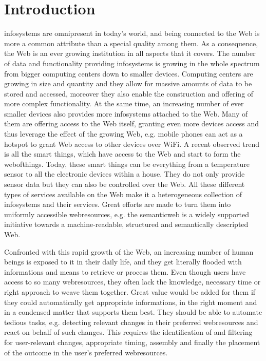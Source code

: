 
\chapter{Introduction}

\textrm{\glspl{infosystem}} are omnipresent in today's world, and being connected to the Web is more a common attribute than a special quality among them.
As a consequence, the Web is an ever growing institution in all aspects that it covers.
The number of data and functionality providing \textrm{\glspl{infosystem}} is growing in the whole spectrum from bigger computing centers down to smaller devices.
Computing centers are growing in size and quantity and they allow for massive amounts of data to be stored and accessed, moreover they also enable the construction and offering of more complex functionality.
At the same time, an increasing number of ever smaller devices also provides more \textrm{\glspl{infosystem}} attached to the Web.
Many of them are offering access to the Web itself, granting even more devices access and thus leverage the effect of the growing Web, e.g. mobile phones can act as a hotspot to grant Web access to other devices over \textrm{WiFi}.
A recent observed trend is all the smart things, which have access to the Web and start to form the \textrm{\gls{webofthings}}.
Today, these smart things can be everything from a temperature sensor to all the electronic devices within a house.
They do not only provide sensor data but they can also be controlled over the Web.
All these different types of services available on the Web make it a heterogeneous collection of \textrm{\glspl{infosystem}} and their services.
Great efforts are made to turn them into uniformly accessible \textrm{\glspl{webresource}}, e.g. the \textrm{\gls{semanticweb}} is a widely supported initiative towards a machine-readable, structured and semantically descripted Web.

Confronted with this rapid growth of the Web, an increasing number of human beings is exposed to it in their daily life, and they get literally flooded with informations and means to retrieve or process them.
Even though users have access to so many \textrm{\glspl{webresource}}, they often lack the knowledge, necessary time or right approach to weave them together.
Great value would be added for them if they could automatically get appropriate informations, in the right moment and in a condensed matter that supports them best.
They should be able to automate tedious tasks, e.g. detecting relevant changes in their preferred \textrm{\glspl{webresource}} and react on behalf of such changes.
This requires the identification of and filtering for user-relevant changes, appropriate timing, assembly and finally the placement of the outcome in the user's preferred \textrm{\glspl{webresource}}.

